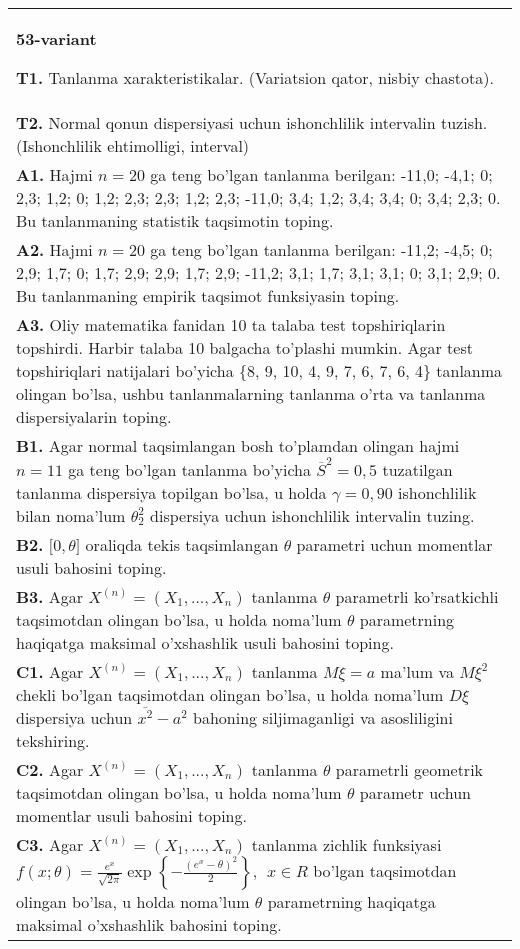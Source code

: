 \documentclass{article}
\begin{document}
\begin{tabular}{m{17cm}}
\textbf{53-variant}
\newline

\textbf{T1.} 
Tanlanma xarakteristikalar. (Variatsion qator, nisbiy chastota).
\\
\textbf{T2.} 
Normal qonun dispersiyasi uchun ishonchlilik intervalin tuzish. (Ishonchlilik ehtimolligi, interval)
\\
\textbf{A1.} 
Hajmi \(n = 20\) ga teng bo'lgan tanlanma berilgan: -11,0; -4,1; 0; 2,3; 1,2; 0; 1,2; 2,3; 2,3; 1,2; 2,3; -11,0; 3,4; 1,2; 3,4; 3,4; 0; 3,4; 2,3; 0. Bu tanlanmaning statistik taqsimotin toping.
\\
\textbf{A2.} 
Hajmi \(n = 20\) ga teng bo'lgan tanlanma berilgan: -11,2; -4,5; 0; 2,9; 1,7; 0; 1,7; 2,9; 2,9; 1,7; 2,9; -11,2; 3,1; 1,7; 3,1; 3,1; 0; 3,1; 2,9; 0. Bu tanlanmaning empirik taqsimot funksiyasin toping.
\\
\textbf{A3.} 
Oliy matematika fanidan 10 ta talaba test topshiriqlarin topshirdi. Harbir talaba 10 balgacha to'plashi mumkin. Agar test topshiriqlari natijalari bo'yicha \{8, 9, 10, 4, 9, 7, 6, 7, 6, 4\} tanlanma olingan bo'lsa, ushbu tanlanmalarning tanlanma o'rta va tanlanma dispersiyalarin toping.
\\
\textbf{B1.} 
Agar normal taqsimlangan bosh to'plamdan olingan hajmi \(n = 11\) ga teng bo'lgan tanlanma bo'yicha \({\overline{S}}^{2} = 0,5\) tuzatilgan tanlanma dispersiya topilgan bo'lsa, u holda \(\gamma = 0,90\) ishonchlilik bilan noma'lum \(\theta_{2}^{2}\) dispersiya uchun ishonchlilik intervalin tuzing.
\\
\textbf{B2.} 
\(\lbrack 0,\theta\rbrack\) oraliqda tekis taqsimlangan \(\theta\) parametri uchun momentlar usuli bahosini toping.
\\
\textbf{B3.} 
Agar \(X^{(n)} = \left( X_{1},...,X_{n} \right)\) tanlanma \(\theta\) parametrli ko'rsatkichli taqsimotdan olingan bo'lsa, u holda noma'lum \(\theta\) parametrning haqiqatga maksimal o'xshashlik usuli bahosini toping.
\\
\textbf{C1.} 
Agar \(X^{(n)} = \left( X_{1},...,X_{n} \right)\) tanlanma \(M\xi = a\) ma'lum va \(M\xi^{2}\) chekli bo'lgan taqsimotdan olingan bo'lsa, u holda noma'lum \(D\xi\) dispersiya uchun \(\overline{x^{2}} - a^{2}\) bahoning siljimaganligi va asosliligini tekshiring.
\\
\textbf{C2.} 
Agar \(X^{(n)} = \left( X_{1},...,X_{n} \right)\) tanlanma \(\theta\) parametrli geometrik taqsimotdan olingan bo'lsa, u holda noma'lum \(\theta\) parametr uchun momentlar usuli bahosini toping.
\\
\textbf{C3.} 
Agar \(X^{(n)} = \left( X_{1},...,X_{n} \right)\) tanlanma zichlik funksiyasi \(f(x;\theta) = \frac{e^{x}}{\sqrt{2\pi}}\exp\left\{ - \frac{\left( e^{x} - \theta \right)^{2}}{2} \right\},\ \ x \in R\) bo'lgan taqsimotdan olingan bo'lsa, u holda noma'lum \(\theta\) parametrning haqiqatga maksimal o'xshashlik bahosini toping.
\\

\end{tabular}
\vspace{1cm}
\end{document}
